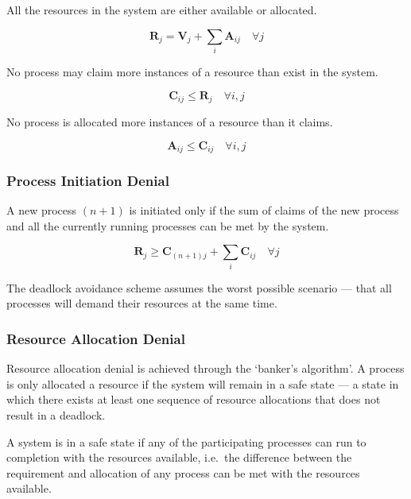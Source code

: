 All the resources in the system are either available or allocated.

\begin{equation*}
  \mathbf{R}_j = \mathbf{V}_j + \sum_i \mathbf{A}_{ij} \quad \forall j
\end{equation*}

No process may claim more instances of a resource than exist in the system.

\begin{equation*}
  \mathbf{C}_{ij} \le \mathbf{R}_j \quad \forall i, j
\end{equation*}

No process is allocated more instances of a resource than it claims.

\begin{equation*}
  \mathbf{A}_{ij} \le \mathbf{C}_{ij} \quad \forall i, j
\end{equation*}

\subsubsection{Process Initiation Denial}

A new process \( \left( n + 1 \right) \) is initiated only if the sum of claims of the new process and all the currently running processes can be met by the system.

\begin{equation*}
  \mathbf{R}_j \ge \mathbf{C}_{\left( n + 1 \right) j} + \sum_i \mathbf{C}_{ij} \quad \forall j
\end{equation*}

The deadlock avoidance scheme assumes the worst possible scenario --- that all processes will demand their resources at the same time.

\subsubsection{Resource Allocation Denial}

Resource allocation denial is achieved through the `banker's algorithm'.
A process is only allocated a resource if the system will remain in a safe state --- a state in which there exists at least one sequence of resource allocations that does not result in a deadlock.

A system is in a safe state if any of the participating processes can run to completion with the resources available, i.e.\ the difference between the requirement and allocation of any process can be met with the resources available.

